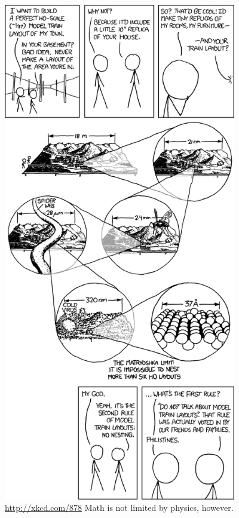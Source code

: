 \begin{figure}
\begin{center}
\includegraphics[width=4in]{graphics/model_rail.png}
\end{center}
\caption[xkcd 878: model rail]{\url{http://xkcd.com/878}  Math is not limited by physics, however.}
\label{fig:xkcd878}
\end{figure}
